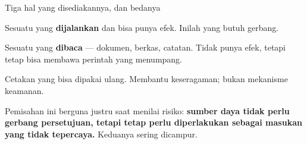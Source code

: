 \documentclass[aspectratio=169,11pt,t]{beamer}
\begin{document}
\begin{frame}[shrink=25]{Tiga hal yang disediakannya, dan bedanya}
\begin{minipage}[t]{0.3253\textwidth}
\begin{icardaccent}
Sesuatu yang \textbf{dijalankan} dan bisa punya efek. Inilah yang butuh gerbang.
\end{icardaccent}
\end{minipage}%
\hfill
\begin{minipage}[t]{0.3253\textwidth}
\begin{icard}
Sesuatu yang \textbf{dibaca} --- dokumen, berkas, catatan. Tidak punya efek, tetapi tetap bisa membawa perintah yang menumpang.
\end{icard}
\end{minipage}%
\hfill
\begin{minipage}[t]{0.3253\textwidth}
\begin{icard}
Cetakan yang bisa dipakai ulang. Membantu keseragaman; bukan mekanisme keamanan.
\end{icard}
\end{minipage}%
{\fontsize{9.4}{12.6}\selectfont\color{fg2}Pemisahan ini berguna justru saat menilai risiko: \textbf{sumber daya tidak perlu gerbang persetujuan, tetapi tetap perlu diperlakukan sebagai masukan yang tidak tepercaya.} Keduanya sering dicampur.\par}\vskip 4pt
\end{frame}
\end{document}
